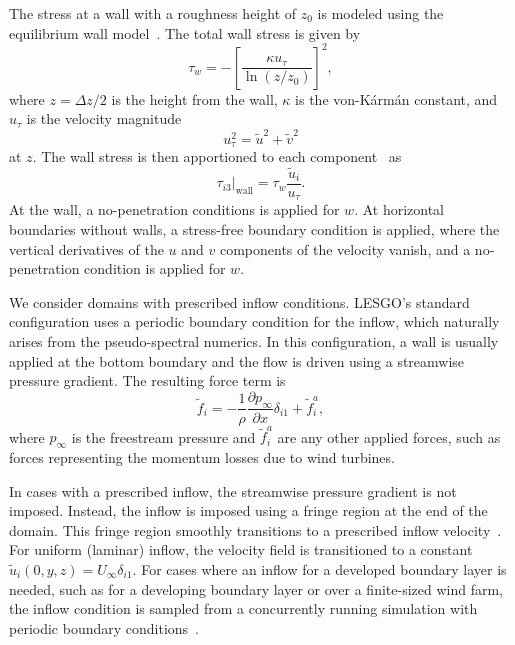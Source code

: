 The stress at a wall with a roughness height of $z_0$ is modeled using the equilibrium wall model~\cite{Albertson1999a}. The total wall stress is given by
\begin{equation}
\tau_w = - \left[  \frac{\kappa u_\tau}{\ln(z/z_0)} \right]^2,
\end{equation}
where $z = \Delta z/2$ is the height from the wall, $\kappa$ is the von-K\'{a}rm\'{a}n constant, and $u_\tau$ is the velocity magnitude 
\begin{equation}
u_\tau^2 = \tilde{u}^2 + \tilde{v}^2
\end{equation}
at $z$. The wall stress is then apportioned to each component~\cite{Schmidt1989a} as
\begin{equation}
\left.\tau_{i3}\right\vert_{\text{wall}}= \tau_w \frac{\tilde{u}_i}{u_\tau}.
\end{equation}
At the wall, a no-penetration conditions is applied for $w$. At horizontal boundaries without walls, a stress-free boundary condition is applied, where the vertical derivatives of the $u$ and $v$ components of the velocity vanish, and a no-penetration condition is applied for $w$.

We consider domains with prescribed inflow conditions. LESGO's standard configuration uses a periodic boundary condition for the inflow, which naturally arises from the pseudo-spectral numerics. In this configuration, a wall is usually applied at the bottom boundary and the flow is driven using a streamwise pressure gradient. The resulting force term is 
\begin{equation}
\tilde{f}_i = -\frac{1}{\rho}\frac{\partial p_\infty}{\partial x} \delta_{i1} + \tilde{f}^a_i,
\end{equation}
where $p_\infty$ is the freestream pressure and $\tilde{f}^a_i$ are any other applied forces, such as forces representing the momentum losses due to wind turbines.

In cases with a prescribed inflow, the streamwise pressure gradient is not imposed. Instead, the inflow is imposed using a fringe region at the end of the domain. This fringe region smoothly transitions to a prescribed inflow velocity~\cite{Stevens2014a}. For uniform (laminar) inflow, the velocity field is transitioned to a constant $\tilde{u}_i(0,y,z) = U_\infty \delta_{i1}$. For cases where an inflow for a developed boundary layer is needed, such as for a developing boundary layer or over a finite-sized wind farm, the inflow condition is sampled from a concurrently running simulation with periodic boundary conditions~\cite{Stevens2014a}.

